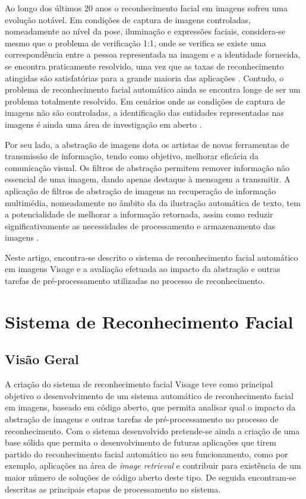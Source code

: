 \documentclass{llncs}
\begin{document}
Ao longo dos últimos 20 anos o reconhecimento facial em imagens sofreu uma evolução notável. Em condições de captura de imagens controladas, nomeadamente ao nível da pose, iluminação e expressões faciais, considera-se mesmo que o problema de verificação 1:1, onde se verifica se existe uma correspondência entre a pessoa representada na imagem e a identidade fornecida, se encontra praticamente resolvido, uma vez que as taxas de reconhecimento atingidas são satisfatórias para a grande maioria das aplicações \cite{Li2011}. Contudo, o problema de reconhecimento facial automático ainda se encontra longe de ser um problema totalmente resolvido. Em cenários onde as condições de captura de imagens não são controladas, a identificação das entidades representadas nas imagens é ainda uma área de investigação em aberto \cite{Li2011,Pinto2009}.

Por seu lado, a abstração de imagens dota os artistas de novas ferramentas de transmissão de informação, tendo como objetivo, melhorar eficácia da comunicação visual. Os filtros de abstração permitem remover informação não essencial de uma imagem, dando apenas destaque à mensagem a transmitir. A aplicação de filtros de abstração de imagens na recuperação de informação multimédia, nomeadamente no âmbito da da ilustração automática de texto, tem a potencialidade de melhorar a informação retornada, assim como reduzir significativamente as necessidades de processamento e armazenamento das imagens \cite{Coelho:2012:IAC:2260641.2260676}. 

Neste artigo, encontra-se descrito  o sistema de reconhecimento facial automático em imagens Visage e a avaliação efetuada ao impacto da abstração e outras tarefas de pré-processamento utilizadas no processo de reconhecimento.

\section{Sistema de Reconhecimento Facial}

\subsection{Visão Geral}
A criação do sistema de reconhecimento facial Visage teve como principal objetivo o desenvolvimento de um sistema automático de reconhecimento facial em imagens, baseado em código aberto, que permita analisar qual o impacto da abstração de imagens e outras tarefas de pré-processamento no processo de reconhecimento. Com o sistema desenvolvido pretende-se ainda a criação de uma base sólida que permita o desenvolvimento de futuras aplicações que tirem partido do reconhecimento facial automático no seu funcionamento, como por exemplo, aplicações na área de \textit{image retrieval} e contribuir para existência de um maior número de soluções de código aberto deste tipo. De seguida encontram-se descritas as principais etapas de processamento no sistema.
\end{document}
